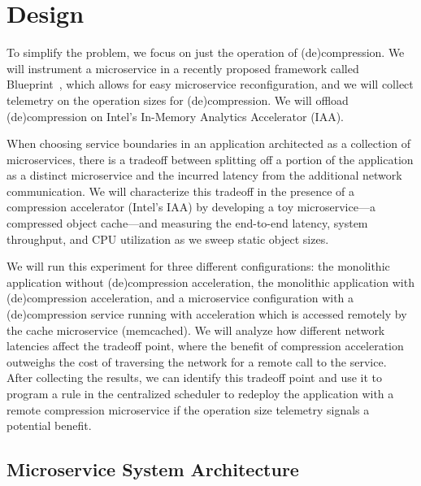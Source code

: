 \section{Design}

To simplify the problem, we focus on just the operation of (de)compression.
We will instrument a microservice in a recently proposed framework called Blueprint~\cite{anand2023blueprint}, which allows for easy microservice reconfiguration, and we will collect telemetry on the operation sizes for (de)compression.
We will offload (de)compression on Intel's In-Memory Analytics Accelerator (IAA).

When choosing service boundaries in an application architected as a collection of microservices, there is a tradeoff between splitting off a portion of the application as a distinct microservice and the incurred latency from the additional network communication.
We will characterize this tradeoff in the presence of a compression accelerator (Intel's IAA) by developing a toy microservice---a compressed object cache---and measuring the end-to-end latency, system throughput, and CPU utilization as we sweep static object sizes.

We will run this experiment for three different configurations: the monolithic application without (de)compression acceleration, the monolithic application with (de)compression acceleration, and a microservice configuration with a (de)compression service running with acceleration which is accessed remotely by the cache microservice (memcached).
We will analyze how different network latencies affect the tradeoff point, where the benefit of compression acceleration outweighs the cost of traversing the network for a remote call to the service.
After collecting the results, we can identify this tradeoff point and use it to program a rule in the centralized scheduler to redeploy the application with a remote compression microservice if the operation size telemetry signals a potential benefit.

\subsection{Microservice System Architecture}

